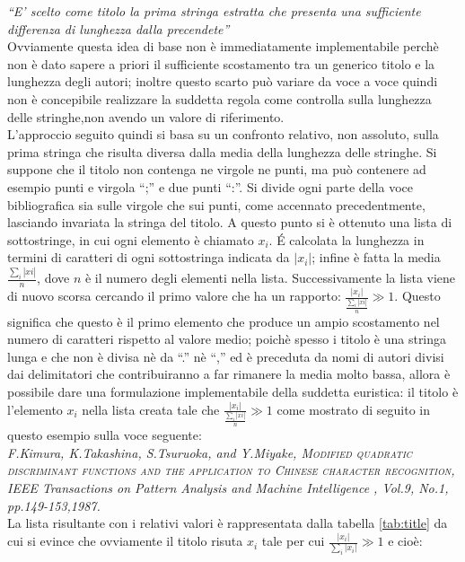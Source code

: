 \textit{``E' scelto come titolo la prima stringa estratta che presenta una sufficiente differenza di lunghezza dalla precendete''}\\

Ovviamente questa idea di base non è immediatamente implementabile perchè non è dato sapere a priori il sufficiente scostamento tra un generico titolo e la lunghezza degli autori; inoltre questo scarto può variare da voce a voce quindi non è concepibile realizzare la suddetta regola come controlla sulla lunghezza delle stringhe,non avendo un valore di riferimento.\\
L'approccio seguito quindi si basa su un confronto relativo, non assoluto, sulla prima stringa che risulta diversa dalla media della lunghezza delle stringhe. Si suppone che il titolo non contenga ne virgole ne punti, ma può contenere ad esempio punti e virgola ``;'' e due punti ``:''. Si divide ogni parte della voce bibliografica sia sulle virgole che sui punti, come accennato precedentmente, lasciando invariata la stringa del titolo. A questo punto si è ottenuto una lista di sottostringe, in cui ogni elemento è chiamato $x_i$. \'E calcolata la lunghezza in termini di caratteri di ogni sottostringa indicata da $|x_i|$; infine è fatta la media $\frac{\sum_i |xi|}{n}$, dove $n$ è il numero degli elementi nella lista. Successivamente la lista viene di nuovo scorsa cercando il primo valore che ha un rapporto: $ \frac{|x_i|}{\frac{\sum_i |xi|}{n} } \gg 1 $. Questo significa che questo è il primo elemento che produce un ampio scostamento nel numero di caratteri rispetto al valore medio; poichè spesso i titolo è una stringa lunga e che non è divisa nè da ``.'' nè ``,'' ed è preceduta da nomi di autori divisi dai delimitatori che contribuiranno a far rimanere la media molto bassa, allora è possibile dare una formulazione implementabile della suddetta euristica: il titolo è l'elemento $x_i$ nella lista creata tale che $ \frac{|x_i|}{ \frac{\sum_i |xi|}{n}} \gg 1 $ come mostrato di seguito in questo esempio sulla voce seguente:\\


\textit{F.Kimura, K.Takashina, S.Tsuruoka, and Y.Miyake, \textsc{Modified quadratic discriminant functions and the application to Chinese character recognition}, IEEE Transactions on Pattern Analysis and Machine Intelligence , Vol.9, No.1, pp.149-153,1987. }\\

La lista risultante con i relativi valori è rappresentata dalla tabella \ref{tab:title} da cui si evince che ovviamente il titolo risuta $x_i$ tale per cui $ \frac{|x_i|}{ \sum_i |x_i|} \gg 1 $ e cioè:

